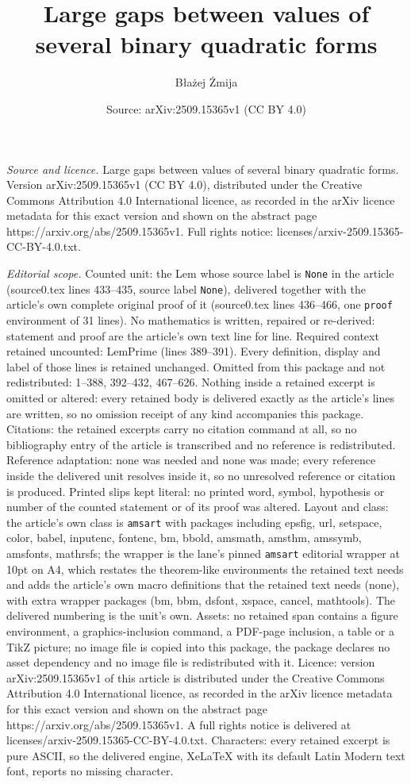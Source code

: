 \documentclass[10pt,a4paper]{amsart}
\title[Large gaps between values of several binary quadratic forms]{Large gaps between values of several binary quadratic forms}
\author{B{\l}a\.zej \.Zmija}
\date{Source: arXiv:2509.15365v1 (CC BY 4.0)}
\begin{document}
\maketitle

\noindent\emph{Source and licence.} Large gaps between values of several binary quadratic forms. Version arXiv:2509.15365v1 (CC BY 4.0), distributed under the Creative Commons Attribution 4.0 International licence, as recorded in the arXiv licence metadata for this exact version and shown on the abstract page https://arxiv.org/abs/2509.15365v1. Full rights notice: licenses/arxiv-2509.15365-CC-BY-4.0.txt.\par\smallskip

\noindent\textit{Editorial scope.} Counted unit: the Lem whose source label is \texttt{None} in the article (source0.tex lines 433--435, source label \texttt{None}), delivered together with the article's own complete original proof of it (source0.tex lines 436--466, one \texttt{proof} environment of 31 lines). No mathematics is written, repaired or re-derived: statement and proof are the article's own text line for line. Required context retained uncounted: LemPrime (lines 389--391). Every definition, display and label of those lines is retained unchanged. Omitted from this package and not redistributed: 1--388, 392--432, 467--626. Nothing inside a retained excerpt is omitted or altered: every retained body is delivered exactly as the article's lines are written, so no omission receipt of any kind accompanies this package. Citations: the retained excerpts carry no citation command at all, so no bibliography entry of the article is transcribed and no reference is redistributed. Reference adaptation: none was needed and none was made; every reference inside the delivered unit resolves inside it, so no unresolved reference or citation is produced. Printed slips kept literal: no printed word, symbol, hypothesis or number of the counted statement or of its proof was altered. Layout and class: the article's own class is \texttt{amsart} with packages including epsfig, url, setspace, color, babel, inputenc, fontenc, bm, bbold, amsmath, amsthm, amssymb, amsfonts, mathrsfs; the wrapper is the lane's pinned \texttt{amsart} editorial wrapper at 10pt on A4, which restates the theorem-like environments the retained text needs and adds the article's own macro definitions that the retained text needs (none), with extra wrapper packages (bm, bbm, dsfont, xspace, cancel, mathtools). The delivered numbering is the unit's own. Assets: no retained span contains a figure environment, a graphics-inclusion command, a PDF-page inclusion, a table or a TikZ picture; no image file is copied into this package, the package declares no asset dependency and no image file is redistributed with it. Licence: version arXiv:2509.15365v1 of this article is distributed under the Creative Commons Attribution 4.0 International licence, as recorded in the arXiv licence metadata for this exact version and shown on the abstract page https://arxiv.org/abs/2509.15365v1. A full rights notice is delivered at licenses/arxiv-2509.15365-CC-BY-4.0.txt. Characters: every retained excerpt is pure ASCII, so the delivered engine, XeLaTeX with its default Latin Modern text font, reports no missing character.
\end{document}
